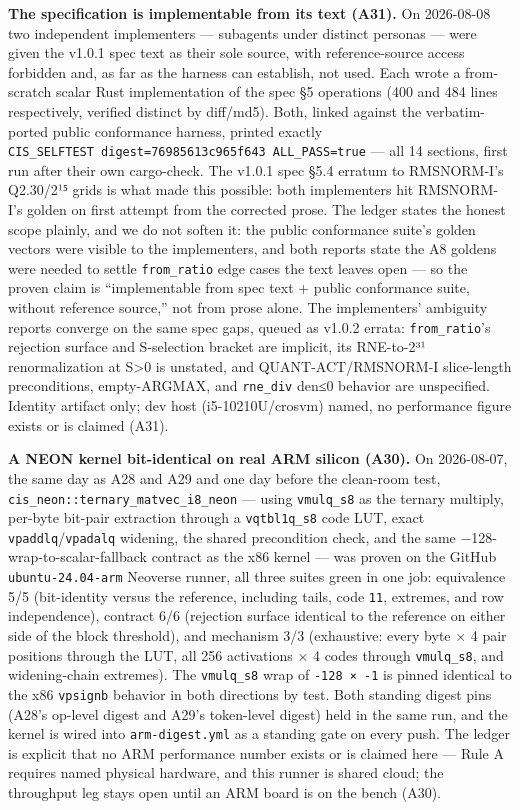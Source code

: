 \documentclass[11pt]{article}
\begin{document}
\textbf{The specification is implementable from its text (A31).} On 2026-08-08 two independent
implementers --- subagents under distinct personas --- were given the v1.0.1 spec text as their sole
source, with reference-source access forbidden and, as far as the harness can establish, not
used. Each wrote a from-scratch scalar Rust implementation of the spec §5 operations (400 and 484
lines respectively, verified distinct by diff/md5). Both, linked against the verbatim-ported
public conformance harness, printed exactly \texttt{CIS\_SELFTEST\ digest=76985613c965f643\ ALL\_PASS=true}
--- all 14 sections, first run after their own cargo-check. The v1.0.1 spec §5.4 erratum to RMSNORM-I's
Q2.30/2¹⁵ grids is what made this possible: both implementers hit RMSNORM-I's golden on first
attempt from the corrected prose. The ledger states the honest scope plainly, and we do not
soften it: the public conformance suite's golden vectors were visible to the implementers, and
both reports state the A8 goldens were needed to settle \texttt{from\_ratio} edge cases the text leaves
open --- so the proven claim is ``implementable from spec text + public conformance suite, without
reference source,'' not from prose alone. The implementers' ambiguity reports converge on the same
spec gaps, queued as v1.0.2 errata: \texttt{from\_ratio}'s rejection surface and S-selection bracket are
implicit, its RNE-to-2³¹ renormalization at S\textgreater0 is unstated, and QUANT-ACT/RMSNORM-I slice-length
preconditions, empty-ARGMAX, and \texttt{rne\_div} den≤0 behavior are unspecified. Identity artifact only;
dev host (i5-10210U/crosvm) named, no performance figure exists or is claimed (A31).

\textbf{A NEON kernel bit-identical on real ARM silicon (A30).} On 2026-08-07, the same day as A28 and A29 and one day before the clean-room test,
\texttt{cis\_neon::ternary\_matvec\_i8\_neon} --- using \texttt{vmulq\_s8} as the ternary multiply, per-byte bit-pair
extraction through a \texttt{vqtbl1q\_s8} code LUT, exact \texttt{vpaddlq}/\texttt{vpadalq} widening, the shared
precondition check, and the same −128-wrap-to-scalar-fallback contract as the x86 kernel --- was
proven on the GitHub \texttt{ubuntu-24.04-arm} Neoverse runner, all three suites green in one job:
equivalence 5/5 (bit-identity versus the reference, including tails, code \texttt{11}, extremes, and row
independence), contract 6/6 (rejection surface identical to the reference on either side of the
block threshold), and mechanism 3/3 (exhaustive: every byte × 4 pair positions through the LUT,
all 256 activations × 4 codes through \texttt{vmulq\_s8}, and widening-chain extremes). The \texttt{vmulq\_s8}
wrap of \texttt{-128\ ×\ -1} is pinned identical to the x86 \texttt{vpsignb} behavior in both directions by test.
Both standing digest pins (A28's op-level digest and A29's token-level digest) held in the same
run, and the kernel is wired into \texttt{arm-digest.yml} as a standing gate on every push. The ledger is
explicit that no ARM performance number exists or is claimed here --- Rule A requires named
physical hardware, and this runner is shared cloud; the throughput leg stays open until an ARM
board is on the bench (A30).
\end{document}
